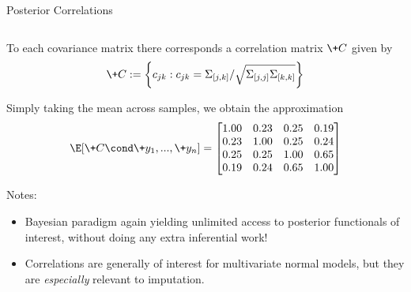 \documentclass[10pt]{beamer}
\begin{document}
\begin{frame}{Posterior Correlations}

\begin{columns}
\begin{column}{0.6\textwidth}

To each covariance matrix there corresponds a correlation matrix $\+C$ given by
\[ \+C := \bigg\{c_{jk} : c_{jk} = \Sigma_{[j,k]} / \sqrt{\Sigma_{[j,j]} \Sigma_{[k,k]}} \bigg\} \]

Simply taking the mean across samples, we obtain the approximation
\[ \E[\+C \cond \+y_1, ..., \+y_n] = 
\begin{bmatrix}
1.00 & 0.23 & 0.25& 0.19 \\
0.23& 1.00& 0.25& 0.24 \\	
0.25& 0.25& 1.00& 0.65 \\	
0.19 &0.24&0.65&1.00 \\		
\end{bmatrix}
\]

\scriptsize 
Notes:
\begin{itemize}
\item Bayesian paradigm again yielding unlimited access to posterior functionals of interest,  without doing any extra inferential work!   %
\item Correlations are generally of interest for multivariate normal models, but they are \textit{especially} relevant to imputation. %
\end{itemize}
\end{column}


\end{columns}
\end{frame}
\end{document}
